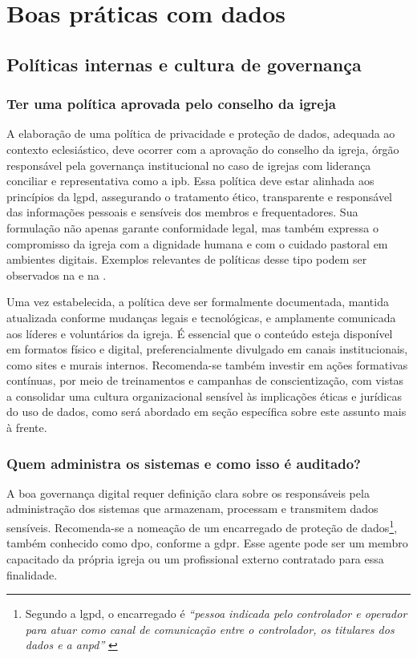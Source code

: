 \section{Boas práticas com dados}

\subsection{Políticas internas e cultura de governança}

\subsubsection{Ter uma política aprovada pelo conselho da igreja}

A elaboração de uma política de privacidade e proteção de dados, adequada ao contexto eclesiástico, deve ocorrer com a aprovação do conselho da igreja, órgão responsável pela governança institucional no caso de igrejas com liderança conciliar e representativa como a \gls{ipb}. Essa política deve estar alinhada aos princípios da \gls{lgpd}, assegurando o tratamento ético, transparente e responsável das informações pessoais e sensíveis dos membros e frequentadores. Sua formulação não apenas garante conformidade legal, mas também expressa o compromisso da igreja com a dignidade humana e com o cuidado pastoral em ambientes digitais. Exemplos relevantes de políticas desse tipo podem ser observados na  e na .

Uma vez estabelecida, a política deve ser formalmente documentada, mantida atualizada conforme mudanças legais e tecnológicas, e amplamente comunicada aos líderes e voluntários da igreja. É essencial que o conteúdo esteja disponível em formatos físico e digital, preferencialmente divulgado em canais institucionais, como sites e murais internos. Recomenda-se também investir em ações formativas contínuas, por meio de treinamentos e campanhas de conscientização, com vistas a consolidar uma cultura organizacional sensível às implicações éticas e jurídicas do uso de dados, como será abordado em seção específica sobre este assunto mais à frente.

\subsubsection{Quem administra os sistemas e como isso é auditado?}

A boa governança digital requer definição clara sobre os responsáveis pela administração dos sistemas que armazenam, processam e transmitem dados sensíveis. Recomenda-se a nomeação de um encarregado de proteção de dados\footnote{Segundo a \gls{lgpd}, o encarregado é \textit{``pessoa indicada pelo controlador e operador para atuar como canal de comunicação entre o controlador, os titulares dos dados e a \gls{anpd}''} \cite[art.~5º, inciso~VIII]{lgpd2018}}, também conhecido como \gls{dpo}, conforme a \gls{gdpr}. Esse agente pode ser um membro capacitado da própria igreja ou um profissional externo contratado para essa finalidade.

